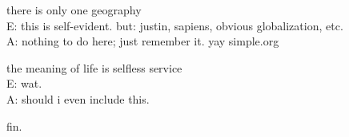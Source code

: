 \documentclass{article}
\begin{document}
\pagebreak

\begin{center}
  \Huge{there is only one geography}\\
  \vspace{3cm}
  \Huge{E: this is self-evident. but: justin, sapiens, obvious globalization, etc.}\\
  \Huge{A: nothing to do here; just remember it. yay simple.org}
\end{center}

\pagebreak

\begin{center}
  \Huge{the meaning of life is selfless service}\\
  \vspace{3cm}
  \Huge{E: wat.}\\
  \Huge{A: should i even include this.}
\end{center}

\pagebreak

\begin{center}
  \Huge{fin.}
\end{center}
\end{document}
